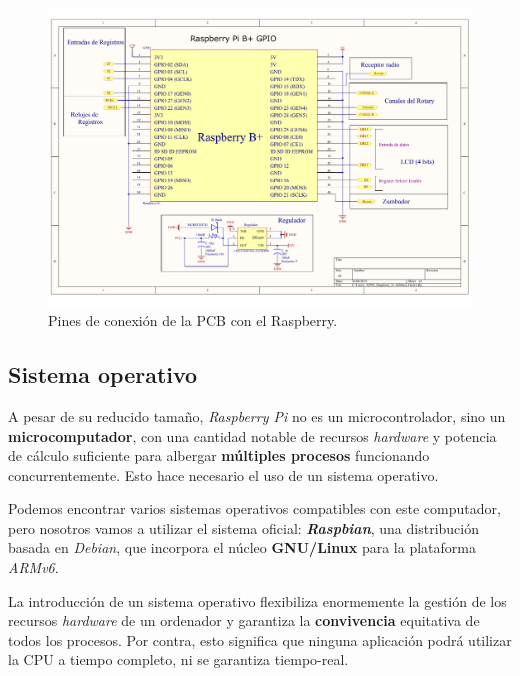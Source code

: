 \smallskip

\begin{figure}[H]
	\noindent \begin{centering}
		\includegraphics[width=\linewidth*2/3]{capitulo3/pcb_gpio}
		\par\end{centering}
	\smallskip
	\caption{\label{fig:pcb_gpio} Pines de conexión de la PCB con el Raspberry.}
\end{figure} 

\smallskip

\subsection{Sistema operativo}

A pesar de su reducido tamaño, \textit{Raspberry Pi} no es un microcontrolador, sino un \textbf{microcomputador}, con una cantidad notable de recursos \textit{hardware} y potencia de cálculo suficiente para albergar \textbf{múltiples procesos} funcionando concurrentemente. Esto hace necesario el uso de un sistema operativo.

Podemos encontrar varios sistemas operativos compatibles con este computador, pero nosotros vamos a utilizar el sistema oficial: \textbf{\textit{Raspbian}}, una distribución basada en \textit{Debian}, que incorpora el núcleo \textbf{GNU/Linux} para la plataforma \textit{ARMv6}.

La introducción de un sistema operativo flexibiliza enormemente la gestión de los recursos \textit{hardware} de un ordenador y garantiza la \textbf{convivencia} equitativa de todos los procesos. Por contra, esto significa que ninguna aplicación podrá utilizar la \acrshort{CPU} a tiempo completo, ni se garantiza tiempo-real.

